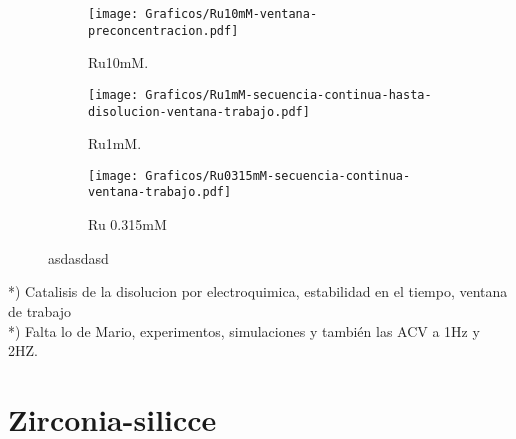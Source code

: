 			\begin{figure}[th]
	 	   	    \begin{subfigure}[t]{0.325\textwidth}
		        	\texttt{[image: Graficos/Ru10mM-ventana-preconcentracion.pdf]}
		       		\caption{Ru10mM.}
		         	\label{fig:Ventana_Ru10mM}
		     		\end{subfigure}
	     		\begin{subfigure}[t]{0.325\textwidth}
		        	\texttt{[image: Graficos/Ru1mM-secuencia-continua-hasta-disolucion-ventana-trabajo.pdf]}
		       		\caption{Ru1mM.}
		         	\label{fig:Ventana_Ru1mM}
		     		\end{subfigure}
	     		\begin{subfigure}[t]{0.325\textwidth}
		        	\texttt{[image: Graficos/Ru0315mM-secuencia-continua-ventana-trabajo.pdf]}
		       		\caption{Ru 0.315mM}
		         	\label{fig:Ventana_Ru0315mM}
		     		\end{subfigure}
	 	   	   	\caption[asdasdasd]{asdasdasd}
	     		\label{fig:ventana-trabajo}
	     	   	\end{figure}
    

		*) Catalisis de la disolucion por electroquimica, estabilidad en el tiempo, ventana de trabajo\\
		*) Falta lo de Mario, experimentos, simulaciones y también las ACV a 1Hz y 2HZ.



	\section{Zirconia-silicce}

